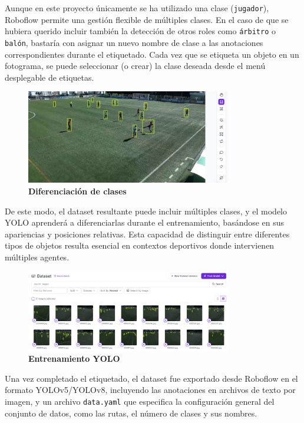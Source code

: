 \documentclass[12pt, a4paper, twoside]{article}
\begin{document}
	Aunque en este proyecto únicamente se ha utilizado una clase (\texttt{jugador}), Roboflow permite una gestión flexible de múltiples clases. En el caso de que se hubiera querido incluir también la detección de otros roles como \texttt{árbitro} o \texttt{balón}, bastaría con asignar un nuevo nombre de clase a las anotaciones correspondientes durante el etiquetado. Cada vez que se etiqueta un objeto en un fotograma, se puede seleccionar (o crear) la clase deseada desde el menú desplegable de etiquetas.
	
	
	\begin{figure}[H]
		\centering
		\includegraphics[width=0.8\textwidth]{image/dif_de_clases}
		\caption{\textbf{Diferenciación de clases}}
		\label{dif_de_clases}
	\end{figure}
	
	De este modo, el dataset resultante puede incluir múltiples clases, y el modelo YOLO aprenderá a diferenciarlas durante el entrenamiento, basándose en sus apariencias y posiciones relativas. Esta capacidad de distinguir entre diferentes tipos de objetos resulta esencial en contextos deportivos donde intervienen múltiples agentes.
	
	\begin{figure}[H]
		\centering
		\includegraphics[width=0.8\textwidth]{image/entr_yolo}
		\caption{\textbf{Entrenamiento YOLO}}
		\label{entr_yolo}
	\end{figure}
	
	Una vez completado el etiquetado, el dataset fue exportado desde Roboflow en el formato YOLOv5/YOLOv8, incluyendo las anotaciones en archivos de texto por imagen, y un archivo \texttt{data.yaml} que especifica la configuración general del conjunto de datos, como las rutas, el número de clases y sus nombres.
	
\end{document}
